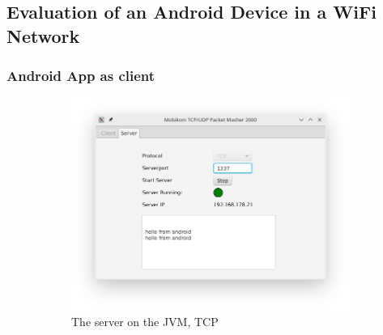 \subsection{Evaluation of an Android Device in a WiFi Network}
\subsubsection{Android App as client}
\begin{figure}[H]
	\centering
	\begin{subfigure}{.49\textwidth}
		\centering
		\includegraphics[width=1\linewidth]{images/task3/subtask2/serverTCPNEW.png}
		\caption{The server on the JVM, TCP}
	\end{subfigure}
	\begin{subfigure}{.49\textwidth}
		\centering

\end{subfigure}
\end{figure}
